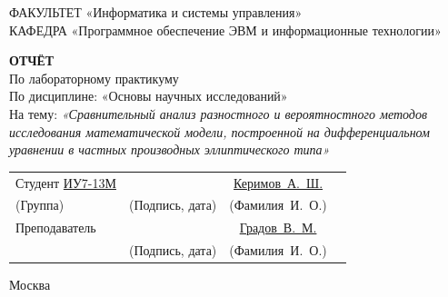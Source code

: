 \begin{titlepage}
	{\doublespacing\small\raggedright
		ФАКУЛЬТЕТ \hspace{28mm} «Информатика и системы управления» \\
		КАФЕДРА \hspace{9mm} «Программное обеспечение ЭВМ и информационные технологии» \\
	}

	\vspace{20mm}

	{\large\bfseries ОТЧЁТ} \\
	По лабораторному практикуму \\
	По дисциплине: «Основы научных исследований» \\
	На тему:
	{\itshape
		«Сравнительный анализ разностного и вероятностного методов исследования математической модели, построенной на дифференциальном уравнении в частных производных эллиптического типа»
	}

	\vfill

	\begin{tabular}{p{} c c c}
		Студент \underline{ИУ7-13М}            & \underline{\hspace{35mm}}     & \underline{Керимов~А.~Ш.}     \\ [-0.6em]
		{\hspace{23.5mm} \scriptsize (Группа)} & {\scriptsize (Подпись, дата)} & {\scriptsize (Фамилия~И.~О.)} \\
		Преподаватель                          & \underline{\hspace{35mm}}     & \underline{Градов~В.~М.}      \\ [-0.6em]
		                                       & {\scriptsize (Подпись, дата)} & {\scriptsize (Фамилия~И.~О.)} \\
	\end{tabular}

	\vspace{15mm}

	Москва {\the\year}
\end{titlepage}

\setcounter{page}{2}
